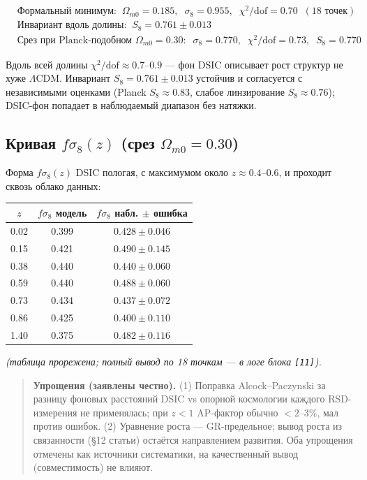 \documentclass{article}
\begin{document}
\begin{align*}
&\text{Формальный минимум:}\;\; \Omega_{m0} = 0.185,\;\; \sigma_8 = 0.955,\;\; \chi^2/\text{dof} = 0.70\;\;(18\text{ точек}) \\
&\text{Инвариант вдоль долины:}\;\; S_8 = 0.761 \pm 0.013 \\
&\text{Срез при Planck-подобном } \Omega_{m0} = 0.30:\;\; \sigma_8 = 0.770,\;\; \chi^2/\text{dof} = 0.73,\;\; S_8 = 0.770
\end{align*}

Вдоль всей долины $\chi^2/\text{dof} \approx 0.7\text{--}0.9$ --- фон DSIC описывает рост структур не хуже $\Lambda$CDM. Инвариант $S_8 = 0.761 \pm 0.013$ устойчив и согласуется с независимыми оценками (Planck $S_8 \approx 0.83$, слабое линзирование $S_8 \approx 0.76$); DSIC-фон попадает в наблюдаемый диапазон без натяжки.

\subsection{Кривая $f\sigma_8(z)$ (срез $\Omega_{m0} = 0.30$)}

Форма $f\sigma_8(z)$ DSIC пологая, с максимумом около $z \approx 0.4\text{--}0.6$, и проходит сквозь облако данных:

\begin{center}
\small
\begin{tabular}{@{}ccc@{}}
\toprule
$z$ & $f\sigma_8$ модель & $f\sigma_8$ набл. $\pm$ ошибка \\
\midrule
0.02 & 0.399 & $0.428 \pm 0.046$ \\
0.15 & 0.421 & $0.490 \pm 0.145$ \\
0.38 & 0.440 & $0.440 \pm 0.060$ \\
0.59 & 0.440 & $0.488 \pm 0.060$ \\
0.73 & 0.434 & $0.437 \pm 0.072$ \\
0.86 & 0.425 & $0.400 \pm 0.110$ \\
1.40 & 0.375 & $0.482 \pm 0.116$ \\
\bottomrule
\end{tabular}
\end{center}

\textit{(таблица прорежена; полный вывод по 18 точкам --- в логе блока \texttt{[11]}).}

\begin{quote}
\textbf{Упрощения (заявлены честно).} (1) Поправка Alcock--Paczynski за разницу фоновых расстояний DSIC vs опорной космологии каждого RSD-измерения не применялась; при $z < 1$ AP-фактор обычно $< 2\text{--}3\%$, мал против ошибок. (2) Уравнение роста --- GR-предельное; вывод роста из связанности (\S12 статьи) остаётся направлением развития. Оба упрощения отмечены как источники систематики, на качественный вывод (совместимость) не влияют.
\end{quote}
\end{document}

